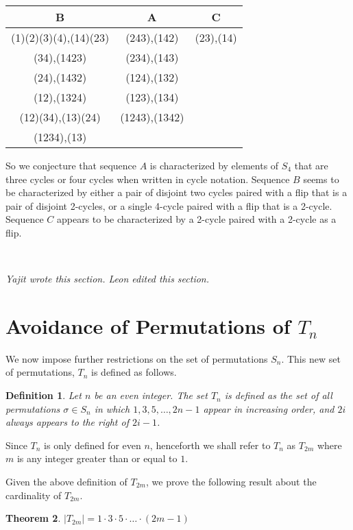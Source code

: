 \documentclass[11pt,letterpaper,twoside,english]{article}
\theoremstyle{theorem}
\newtheorem{theorem}{Theorem}[section]
\newtheorem{definition}[theorem]{Definition}
\theoremstyle{remark}
\begin{document}
\begin{center}
\begin{tabular}{|c|c|c|}
B &A&C\\
\hline
(1)(2)(3)(4),(14)(23)&(243),(142)&(23),(14)\\
(34),(1423)&(234),(143)&\\
(24),(1432)&(124),(132)&\\
(12),(1324)&(123),(134)&\\
(12)(34),(13)(24)&(1243),(1342)&\\
(1234),(13)&&\\
\end{tabular}
\end{center}

So we conjecture that sequence $A$ is characterized by elements of $S_4$ that are three cycles or four cycles when written in cycle notation. Sequence $B$ seems to be characterized by either a pair of disjoint two cycles paired with a flip that is a pair of disjoint 2-cycles, or a single 4-cycle paired with a flip that is a 2-cycle. Sequence $C$ appears to be characterized by a 2-cycle paired with a 2-cycle as a flip. 

\

\emph{Yajit wrote this section. Leon edited this section.}

\section{Avoidance of Permutations of $T_n$}
\label{Tn}
We now impose further restrictions on the set of permutations $S_n$. This new set of permutations, $T_n$ is defined as follows.

\begin{definition}
Let $n$ be an even integer. The set $T_n$ is defined as the set of all permutations $\sigma \in S_n$ in which $1,3,5,\ldots,2n-1$ appear in increasing order, and $2i$ always appears to the right of $2i-1$.
\end{definition}

Since $T_n$ is only defined for even $n$, henceforth we shall refer to $T_n$ as $T_{2m}$ where $m$ is any integer greater than or equal to $1$.

Given the above definition of $T_{2m}$, we prove the following result about the cardinality of $T_{2m}$.

\begin{theorem}
$|T_{2m}| = 1 \cdot 3 \cdot 5 \cdot \ldots \cdot (2m-1)$
\end{theorem}
\end{document}
